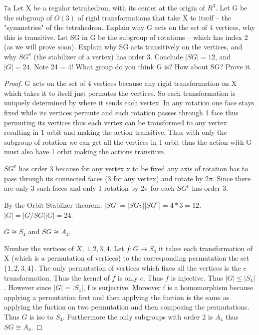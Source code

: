\documentclass{article}
\newcommand{\abs}[1]{\lvert #1\rvert}
\begin{document}
\bigskip

\begin{PROB}{7a}\label{Problem 7a.}
    Let X be a regular tetrahedron, with its center at the origin of $R^3$. Let G be the subgroup of $O(3)$ of rigid transformations that take X to itself -- the "symmetries" of the tetrahedron. Explain why G acts on the set of 4 vertices, why this is transitive. Let SG in G be the subgroup of rotations -- which has index 2 (as we will prove soon). Explain why SG acts transitively on the vertices, and why $SG^v$ (the stabilizer of a vertex) has order 3. Conclude $|SG| = 12$, and $|G| = 24$.  Note 24 = 4! What group do you think G is? How about SG? Prove it. 
\end{PROB}
\begin{proof}
    G acts on the set of 4 vertices because any rigid transformation on X which takes it to itself just permutes the vertices. So each transformation is uniquely determined by where it sends each vertex. In any rotation one face stays fixed while its vertices permute and each rotation passes through 1 face thus permuting its vertices thus each vertex can be transformed to any vertex resulting in 1 orbit and making the action transitive. Thus with only the subgroup of rotation we can get all the vertices in 1 orbit thus the action with G must also have 1 orbit making the actions transitive.

    $SG^v$ has order 3 because for any vertex x to be fixed any axis of rotation has to pass through its connected faces (3 for any vertex) and rotate by $2 \pi$. Since there are only 3 such faces and only 1 rotation by $2 \pi$ for each $SG^v$ has order 3.
    
    By the Orbit Stablizer theorem, $|SG| = |SGv||SG^v| = 4 * 3 = 12$. $|G| = |G/SG||G| = 24$.
    
    $G \cong S_4$ and $SG \cong A_4$.

    Number the vertices of $X$, $1, 2, 3, 4$.
    Let $f: G \to S_4$ it takes each transformation of X (which is a permutation of vertices) to the corresponding permutation the set $\{1, 2, 3, 4\}$. The only permutation of vertices which fixes all the vertices is the $e$ transformation. Thus the kernel of $f$ is only $e$. Thus $f$ is injective. Thus $\abs{G} \leq \abs{S_4}$. However since $\abs{G} = \abs{S_4}$, f is surjective. Moreover f is a homomorphism because applying a permutation first and then applying the fuction is the same as applying the fuction on two permutation and then composing the permutations. Thus $G$ is iso to $S_4$. Furthermore the only subgroups with order 2 is $A_4$ thus $SG \cong A_4$.
\end{proof}
\end{document}
